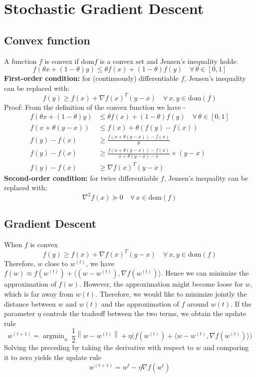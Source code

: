 \documentclass{book}
\DeclareMathOperator*{\argmin}{argmin}
\newcommand{\norm}[1]{\left\lVert#1\right\rVert}
\begin{document}
\chapter{Stochastic Gradient Descent}
\section{Convex function}
A function $f$ is convex if $\text{dom} f$ is a convex set and Jensen's inequality holds:
\[ f(\theta x + (1-\theta) y) \leq \theta f(x) + (1-\theta) f(y) \quad \forall \, \theta \in [0,1]\]
\textbf{First-order condition:}
for (continuously) differentiable $f$, Jensen's inequality can be replaced with:
\[ f(y) \geq f(x) + \nabla f(x)^T (y -x) \quad \forall \, x,y \in \text{dom}(f)\]
Proof: From the definition of the convex function we have -
\begin{align*}
f(\theta x + (1-\theta) y) & \leq \theta f(x) + (1-\theta) f(y) \quad \forall \, \theta \in [0,1] \\
f(x + \theta (y-x)) & \leq f(x) + \theta (f(y) - f(x)) \\
f(y) - f(x) & \geq \frac{f(x + \theta (y-x)) - f(x)}{\theta} \\
f(y) - f(x) & \geq \frac{f(x + \theta (y-x)) - f(x)}{x +\theta (y-x) - x} \times (y-x) \\
f(y) - f(x) & \geq \nabla f(x)^T (y-x)
\end{align*}
\textbf{Second-order condition:}
for twice differentiable $f$, Jensen's inequality can be replaced with:
\[ \nabla^2 f(x) \succeq 0 \quad \forall \, x \in \text{dom}(f)\]

\section{Gradient Descent}
When $f$ is convex 
\[ f(y) \geq f(x) + \nabla f(x)^T (y -x) \quad \forall \, x,y \in \text{dom}(f)\]
Therefore, $w$ close to $w^{(t)}$, we have $f(w) \approx f(w^{(t)}) + \langle (w - w^{(t)}), \nabla f(w^{(t)}) \rangle$.
Hence we can minimize the approximation of $f(w)$. However, the approximation might become loose for $w$, which is far away from $w(t)$. Therefore, we would like to minimize jointly the distance between $w$ and $w(t)$ and the approximation of $f$ around $w(t)$. If the parameter $\eta$ controls the tradeoff between the two terms, we obtain the update rule
\[ w^{(t+1)} = \argmin_w \, \frac{1}{2}\norm{w-w^{(t)}} + \eta \Big(f(w^{(t)}) + \langle w - w^{(t)}, \nabla f(w^{(t)}) \rangle\Big)\]
Solving the preceding by taking the derivative with respect to $w$ and comparing it to zero yields the update rule
\[ w^{(t+1)} = w^{t} - \eta \nabla f(w^{t}) \]
\end{document}

